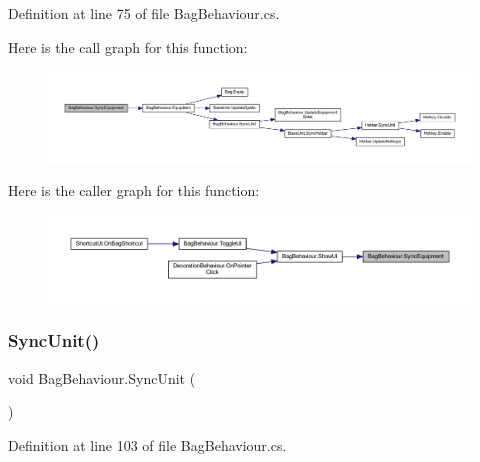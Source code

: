 Definition at line 75 of file Bag\+Behaviour.\+cs.

Here is the call graph for this function\+:
\nopagebreak
\begin{figure}[H]
\begin{center}
\leavevmode
\includegraphics[width=350pt]{class_bag_behaviour_ab7a8add6e04a204513a05f0d312df676_cgraph}
\end{center}
\end{figure}
Here is the caller graph for this function\+:
\nopagebreak
\begin{figure}[H]
\begin{center}
\leavevmode
\includegraphics[width=350pt]{class_bag_behaviour_ab7a8add6e04a204513a05f0d312df676_icgraph}
\end{center}
\end{figure}
\mbox{\label{class_bag_behaviour_a1ab1c5f24022bf503ad3d3a18387515f}} 
\subsubsection{\texorpdfstring{SyncUnit()}{SyncUnit()}}
{\footnotesize\ttfamily void Bag\+Behaviour.\+Sync\+Unit (\begin{DoxyParamCaption}{ }\end{DoxyParamCaption})}



Definition at line 103 of file Bag\+Behaviour.\+cs.

